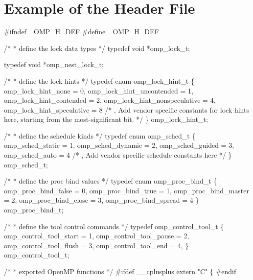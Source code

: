 \pagebreak
\section{Example of the  Header File}
\label{sec:Example of the omp.h Header File}
{\small \begin{codepar}
\#ifndef \_OMP\_H\_DEF
\#define \_OMP\_H\_DEF

/*
 * define the lock data types
 */
typedef void *omp\_lock\_t;

typedef void *omp\_nest\_lock\_t;

/*
 * define the lock hints
 */
typedef enum omp\_lock\_hint\_t 
\{
 omp\_lock\_hint\_none = 0,
 omp\_lock\_hint\_uncontended = 1,
 omp\_lock\_hint\_contended = 2,
 omp\_lock\_hint\_nonspeculative = 4,
 omp\_lock\_hint\_speculative = 8
/* , Add vendor specific constants for lock hints here,
   starting from the most-significant bit. */
\} omp\_lock\_hint\_t;

/*
 * define the schedule kinds
 */
typedef enum omp\_sched\_t
\{
 omp\_sched\_static = 1,
 omp\_sched\_dynamic = 2,
 omp\_sched\_guided = 3,
 omp\_sched\_auto = 4
/* , Add vendor specific schedule constants here */
\} omp\_sched\_t;

/*
* define the proc bind values 
*/ 
typedef enum omp\_proc\_bind\_t
\{
 omp\_proc\_bind\_false = 0,
 omp\_proc\_bind\_true = 1,
 omp\_proc\_bind\_master = 2,
 omp\_proc\_bind\_close = 3,
 omp\_proc\_bind\_spread = 4
\} omp\_proc\_bind\_t; 
\begin{samepage}
/*
 * define the tool control commands 
 */
typedef omp\_control\_tool\_t 
\{
  omp\_control\_tool\_start = 1,
  omp\_control\_tool\_pause = 2,
  omp\_control\_tool\_flush = 3,
  omp\_control\_tool\_end = 4,
\} omp\_control\_tool\_t;
\end{samepage}
/*
 * exported OpenMP functions
 */
\#ifdef _\_cplusplus
extern "C"
\{
\#endif


\end{codepar}}
